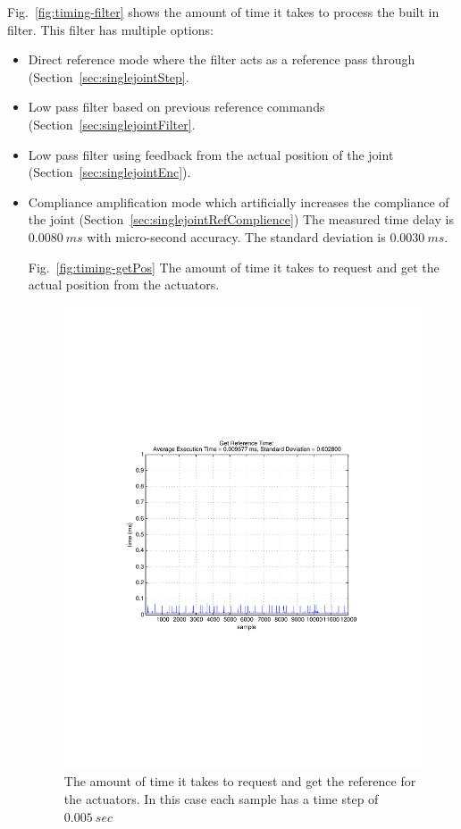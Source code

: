 Fig.~\ref{fig:timing-filter} shows the amount of time it takes to process the built in filter.
This filter has multiple options:
\begin{itemize}
\item Direct reference mode where the filter acts as a reference pass through (Section~\ref{sec:singlejointStep}.
\item Low pass filter based on previous reference commands (Section~\ref{sec:singlejointFilter}.
\item Low pass filter using feedback from the actual position of the joint (Section~\ref{sec:singlejointEnc}).
\item Compliance amplification mode which artificially increases the compliance of the joint (Section~\ref{sec:singlejointRefComplience})
The measured time delay is $0.0080~ms$ with micro-second accuracy.
The standard deviation is $0.0030~ms$.





Fig.~\ref{fig:timing-getPos} The amount of time it takes to request and get the actual position from the actuators.





\begin{figure}[thpb]
  \centering
\includegraphics[width=0.6\columnwidth]{./timingData/getRef.pdf}
  \caption{The amount of time it takes to request and get the reference for the actuators.  In this case each sample has a time step of $0.005~sec$}
  \label{fig:timing-getRef}
\end{figure}



\end{itemize}
